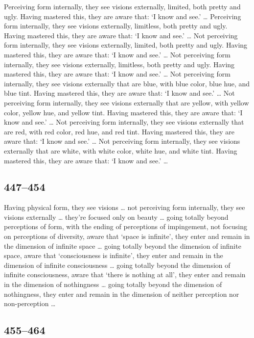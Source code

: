 \documentclass[12pt,openany]{book}%
\begin{document}
Perceiving form internally, they see visions externally, limited, both pretty and ugly. Having mastered this, they are aware that: ‘I know and see.’ … Perceiving form internally, they see visions externally, limitless, both pretty and ugly. Having mastered this, they are aware that: ‘I know and see.’ … Not perceiving form internally, they see visions externally, limited, both pretty and ugly. Having mastered this, they are aware that: ‘I know and see.’ … Not perceiving form internally, they see visions externally, limitless, both pretty and ugly. Having mastered this, they are aware that: ‘I know and see.’ … Not perceiving form internally, they see visions externally that are blue, with blue color, blue hue, and blue tint. Having mastered this, they are aware that: ‘I know and see.’ … Not perceiving form internally, they see visions externally that are yellow, with yellow color, yellow hue, and yellow tint. Having mastered this, they are aware that: ‘I know and see.’ … Not perceiving form internally, they see visions externally that are red, with red color, red hue, and red tint. Having mastered this, they are aware that: ‘I know and see.’ … Not perceiving form internally, they see visions externally that are white, with white color, white hue, and white tint. Having mastered this, they are aware that: ‘I know and see.’ … 

\subsection*{447–454 }

Having physical form, they see visions … not perceiving form internally, they see visions externally … they’re focused only on beauty … going totally beyond perceptions of form, with the ending of perceptions of impingement, not focusing on perceptions of diversity, aware that ‘space is infinite’, they enter and remain in the dimension of infinite space … going totally beyond the dimension of infinite space, aware that ‘consciousness is infinite’, they enter and remain in the dimension of infinite consciousness … going totally beyond the dimension of infinite consciousness, aware that ‘there is nothing at all’, they enter and remain in the dimension of nothingness … going totally beyond the dimension of nothingness, they enter and remain in the dimension of neither perception nor non-perception … 

\subsection*{455–464 }
\end{document}
